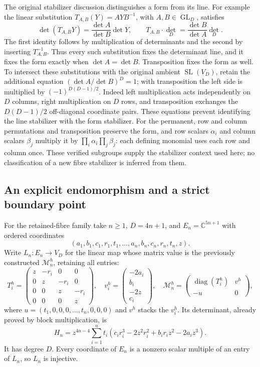 The original stabilizer discussion distinguishes a form from its line.
For example the linear substitution $T_{A,B}(Y)=AYB^{-1}$, with
$A,B\in\operatorname{GL}_D$, satisfies
\[
 \det(T_{A,B}Y)=\frac{\det A}{\det B}\det Y,
 \qquad
 T_{A,B}\cdot\det_D=\frac{\det B}{\det A}\det_D.
\]
The first identity follows by multiplication of determinants and the
second by inserting $T_{A,B}^{-1}$. Thus every such substitution fixes
the determinant line, and it fixes the form exactly when
$\det A=\det B$. Transposition fixes the form as well. To intersect
these substitutions with the original ambient $\operatorname{SL}(V_D)$,
retain the additional equation
$(\det A/\det B)^D=1$; with transposition the left side is multiplied
by $(-1)^{D(D-1)/2}$. Indeed left multiplication acts independently on
$D$ columns, right multiplication on $D$ rows, and transposition exchanges
the $D(D-1)/2$ off-diagonal coordinate pairs. These equations prevent
identifying the line stabilizer with the form stabilizer.
For the permanent, row and column permutations and transposition preserve
the form, and row scalars $\alpha_i$ and column scalars $\beta_j$
multiply it by $\prod_i\alpha_i\prod_j\beta_j$: each defining monomial
uses each row and column once. These verified subgroups supply the
stabilizer context used here; no classification of a new fibre stabilizer
is inferred from them.

\subsection{An explicit endomorphism and a strict boundary point}

For the retained-fibre family take $n\ge1$, $D=4n+1$, and
$E_n=\mathbb C^{5n+1}$ with ordered coordinates
\[
 (a_1,b_1,c_1,r_1,t_1,\ldots,a_n,b_n,c_n,r_n,t_n,z).
\]
Write $L_n:E_n\to V_D$ for the linear map whose matrix value is
the previously constructed $\mathcal M_n^h$, retaining all entries:
\[
 T_i^h=\begin{pmatrix}z&-r_i&0&0\\0&z&-r_i&0\\0&0&z&-r_i\\0&0&0&z\end{pmatrix},
 \quad v_i^h=\begin{pmatrix}-2a_i\\b_i\\-2z\\c_i\end{pmatrix},
 \quad
 \mathcal M_n^h=\begin{pmatrix}\operatorname{diag}(T_i^h)&v^h\\-u&0\end{pmatrix},
\]
where $u=(t_1,0,0,0,\ldots,t_n,0,0,0)$ and $v^h$ stacks the
$v_i^h$. Its determinant, already proved by block multiplication, is
\[
 H_n=z^{4n-4}\sum_{i=1}^n t_i
 (c_ir_i^3-2z^2r_i^2+b_ir_iz^2-2a_iz^3).
\]
It has degree $D$. Every coordinate of $E_n$ is a nonzero scalar
multiple of an entry of $L_n$, so $L_n$ is injective.

